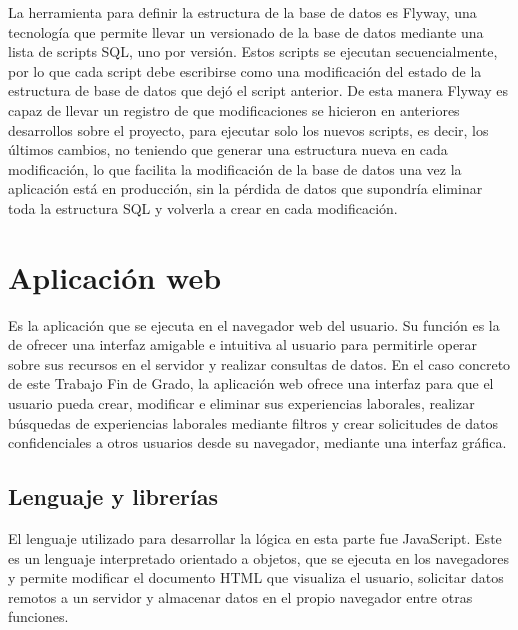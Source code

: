\documentclass[a4paper, 12pt]{book}
\begin{document}
La herramienta para definir la estructura de la base de datos es Flyway, una tecnología que permite llevar un versionado de la base de datos mediante una lista de scripts SQL, uno por versión. Estos scripts se ejecutan secuencialmente, por lo que cada script debe escribirse como una modificación del estado de la estructura de base de datos que dejó el script anterior. 
De esta manera Flyway es capaz de llevar un registro de que modificaciones se hicieron en anteriores desarrollos sobre el proyecto, para ejecutar solo los nuevos scripts, es decir, los últimos cambios, no teniendo que generar una estructura nueva en cada modificación, lo que facilita la modificación de la base de datos una vez la aplicación está en producción, 
sin la pérdida de datos que supondría eliminar toda la estructura SQL y volverla a crear en cada modificación.


\section{Aplicación web}
\label{sec:intro_webapplication}

Es la aplicación que se ejecuta en el navegador web del usuario. Su función es la de ofrecer una interfaz amigable e intuitiva al usuario para permitirle operar sobre sus recursos en el servidor y realizar consultas de datos. 
En el caso concreto de este Trabajo Fin de Grado, la aplicación web ofrece una interfaz para que el usuario pueda crear, modificar e eliminar sus experiencias laborales, realizar búsquedas de experiencias laborales mediante filtros 
y crear solicitudes de datos confidenciales a otros usuarios desde su navegador, mediante una interfaz gráfica.

\subsection{Lenguaje y librerías}
\label{subsec:intro_webapplication_languageandlibraries}

El lenguaje utilizado para desarrollar la lógica en esta parte fue JavaScript. Este es un lenguaje interpretado orientado a objetos, que se ejecuta en los navegadores y permite modificar el documento HTML que visualiza el usuario, solicitar datos remotos a un servidor y almacenar datos en el propio navegador entre otras funciones.
\end{document}
